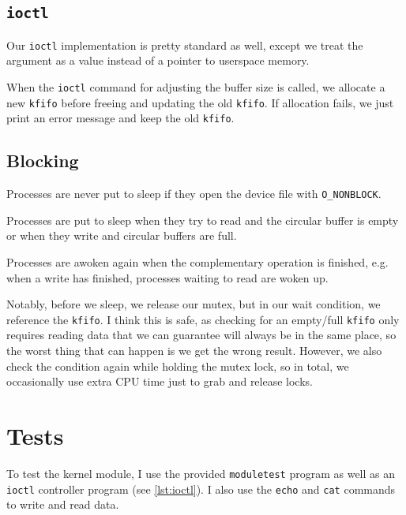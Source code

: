 \documentclass{report}
\begin{document}
\subsection*{\texttt{ioctl}}

Our \texttt{ioctl} implementation is pretty standard as well, except we treat the argument as a value instead of a pointer to userspace memory.

When the \texttt{ioctl} command for adjusting the buffer size is called, we allocate a new \texttt{kfifo} before freeing and updating the old \texttt{kfifo}. If allocation fails, we just print an error message and keep the old \texttt{kfifo}.

\subsection*{Blocking}

Processes are never put to sleep if they open the device file with \texttt{O\_NONBLOCK}.

Processes are put to sleep when they try to read and the circular buffer is empty
or when they write and circular buffers are full.

Processes are awoken again when the complementary operation is finished,
e.g. when a write has finished, processes waiting to read are woken up.

Notably, before we sleep, we release our mutex, but in our wait condition, we reference the \texttt{kfifo}.
I think this is safe, as checking for an empty/full \texttt{kfifo} only requires reading data
that we can guarantee will always be in the same place,
so the worst thing that can happen is we get the wrong result.
However, we also check the condition again while holding the mutex lock,
so in total, we occasionally use extra CPU time just to grab and release locks.

\section*{Tests}

To test the kernel module, I use the provided \texttt{moduletest} program
as well as an \texttt{ioctl} controller program (see \autoref{lst:ioctl}).
I also use the \texttt{echo} and \texttt{cat} commands to write and read data.
\end{document}
